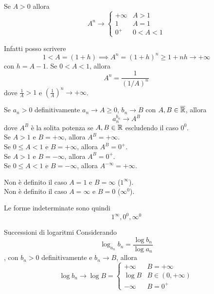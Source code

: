 \documentclass[a4paper]{article}
\begin{document}
\begin{snippetproposition}{}
    Se \(A > 0\) allora
    \[
        A^n \to \begin{cases}
            +\infty & A > 1 \\
            1 & A = 1 \\
            0^+ & 0 < A < 1
        \end{cases}
    \]
\end{snippetproposition}

\begin{snippetproof}{}
    Infatti posso scrivere
    \[
        1 < A = (1+h) \implies A^n = {(1+h)}^n \geq 1 + nh \to +\infty
    \]
    con \(h = A - 1\).
    Se \(0 < A < 1\), allora
    \[
        A^n = \frac{1}{{(1/A)}^n}
    \]
    dove \(\frac{1}{A} > 1\) e \({(\frac{1}{A})}^n \to +\infty\).
\end{snippetproof}

\begin{snippetproposition}{}
    Se \(a_n > 0\) definitivamente \(a_n \to A \geq 0\), \(b_n \to B\) con \(A,B\in\overline{\mathbb{R}}\),
    allora
    \[
        a_n^{b_n} \to A^B
    \]
    dove \(A^B\) è la solita potenza se \(A,B \in \mathbb{R}\) escludendo il caso \(0^0\). \\
    Se \(A> 1\) e \(B=+\infty\), allora \(A^B = +\infty\).\\
    Se \(0\leq A <1\) e \(B=+\infty\), allora \(A^B = 0^+\). \\
    Se \(A > 1\) e \(B=-\infty\), allora \(A^B = 0^+\). \\
    Se \(0\leq A <1\) e \(B=-\infty\), allora \(A^{-\infty} = +\infty\).

    Non è definito il caso \(A=1\) e \(B=\infty\) (\(1^\infty\)). \\
    Non è definito il caso \(A=\infty\) e \(B=0\) (\(\infty^0\)).
\end{snippetproposition}

Le forme indeterminate sono quindi
\[
    1^\infty, 0^0, \infty^0
\]

\begin{snippetproposition}{Successioni di logaritmi}
    Considerando  \[ \log_{a_n}b_n = \frac{\log b_n}{\log a_n} \],
    con \(b_n > 0\) definitivamente e \(b_n\to B\),
    allora
    \[
        \log b_n \to \log B = \begin{cases}
            +\infty & B = +\infty \\
            \log B & B \in (0, +\infty) \\
            -\infty & B=0^+
        \end{cases}
    \]
\end{snippetproposition}
\end{document}
